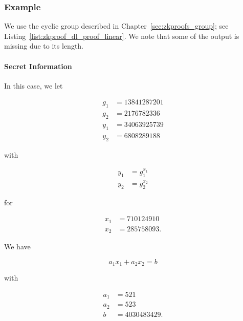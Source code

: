 \subsubsection{Example}

\begin{example}

We use the \gls{cyclic group} described in Chapter~\ref{sec:zkproofs_group};
see Listing~\ref{list:zkproof_dl_proof_linear}.
We note that some of the output is missing due to its length.

\paragraph{Secret Information}
In this case, we let

\begin{align}
    g_{1} &= 13841287201
        \nonumber\\
    g_{2} &= 2176782336
        \nonumber\\
    y_{1} &= 34063925739
        \nonumber\\
    y_{2} &= 6808289188
\end{align}

\noindent
with

\begin{align}
    y_{1} &= g_{1}^{x_{1}}
        \nonumber\\
    y_{2} &= g_{2}^{x_{2}}
\end{align}

\noindent
for

\begin{align}
    x_{1} &= 710124910
        \nonumber\\
    x_{2} &= 285758093.
\end{align}

\noindent
We have

\begin{equation}
    a_{1}x_{1} + a_{2}x_{2} = b
\end{equation}

\noindent
with

\begin{align}
    a_{1} &= 521
        \nonumber\\
    a_{2} &= 523
        \nonumber\\
    b &= 4030483429.
\end{align}


\end{example}
